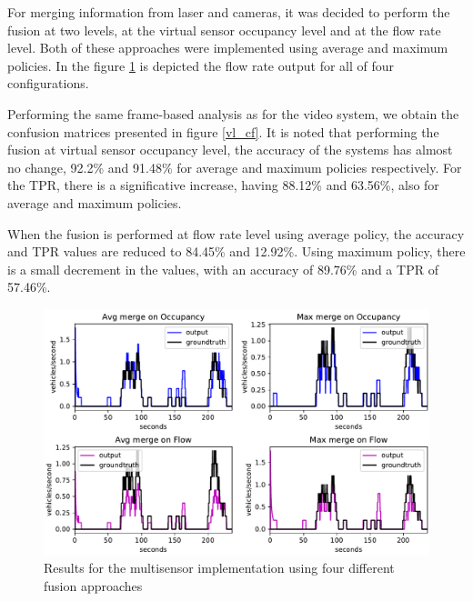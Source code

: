 For merging information from laser and cameras, it was decided to perform the fusion at two levels, at the virtual sensor occupancy level and at the flow rate level. Both of these approaches were implemented using average and maximum policies. In the figure \ref{vl_res} is depicted the flow rate output for all of four configurations.

Performing the same frame-based analysis as for the video system, we obtain the confusion matrices presented in figure \ref{vl_cf}. It is noted that performing the fusion at virtual sensor occupancy level, the accuracy of the systems has almost no change, 92.2\% and 91.48\% for average and maximum policies respectively. For the TPR, there is a significative increase, having 88.12\% and 63.56\%, also for average and maximum policies.

When the fusion is performed at flow rate level using average policy, the accuracy and TPR values are reduced to 84.45\% and 12.92\%. Using maximum policy, there is a small decrement in the values, with an accuracy of 89.76\% and a TPR of 57.46\%.

\begin{figure}[htb!]
\centering
\includegraphics[scale=0.5]{fig/4/vl_res.pdf}
\caption{Results for the multisensor implementation using four different fusion approaches}
\label{vl_res}
\end{figure}

